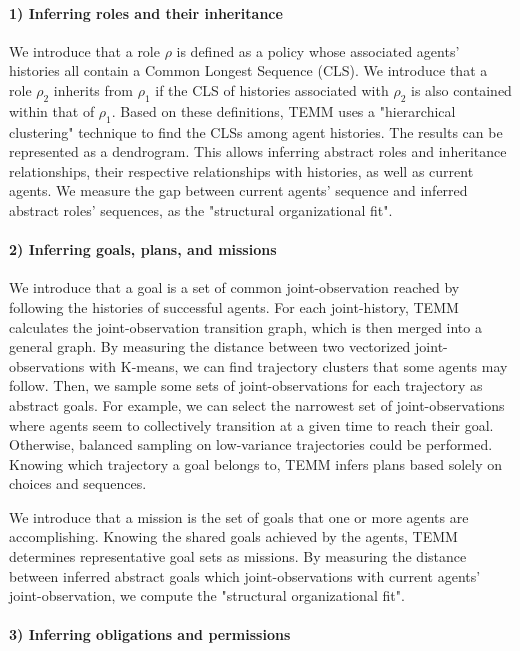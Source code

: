 \documentclass[sigconf,anonymous]{aamas}
\begin{document}
\paragraph{\textbf{1) Inferring roles and their inheritance}}

We introduce that a role $\rho$ is defined as a policy whose associated agents' histories all contain a Common Longest Sequence (CLS). We introduce that a role $\rho_2$ inherits from $\rho_1$ if the CLS of histories associated with $\rho_2$ is also contained within that of $\rho_1$.
Based on these definitions, TEMM uses a "hierarchical clustering" technique to find the CLSs among agent histories. The results can be represented as a dendrogram. This allows inferring abstract roles and inheritance relationships, their respective relationships with histories, as well as current agents.
We measure the gap between current agents' sequence and inferred abstract roles' sequences, as the "structural organizational fit".

\paragraph{\textbf{2) Inferring goals, plans, and missions}}

We introduce that a goal is a set of common joint-observation reached by following the histories of successful agents.
For each joint-history, TEMM calculates the joint-observation transition graph, which is then merged into a general graph. By measuring the distance between two vectorized joint-observations with K-means, we can find trajectory clusters that some agents may follow. Then, we sample some sets of joint-observations for each trajectory as abstract goals. For example, we can select the narrowest set of joint-observations where agents seem to collectively transition at a given time to reach their goal. Otherwise, balanced sampling on low-variance trajectories could be performed. Knowing which trajectory a goal belongs to, TEMM infers plans based solely on choices and sequences.

We introduce that a mission is the set of goals that one or more agents are accomplishing.
Knowing the shared goals achieved by the agents, TEMM determines representative goal sets as missions.
By measuring the distance between inferred abstract goals which joint-observations with current agents' joint-observation, we compute the "structural organizational fit".

\paragraph{\textbf{3) Inferring obligations and permissions}}
\end{document}
